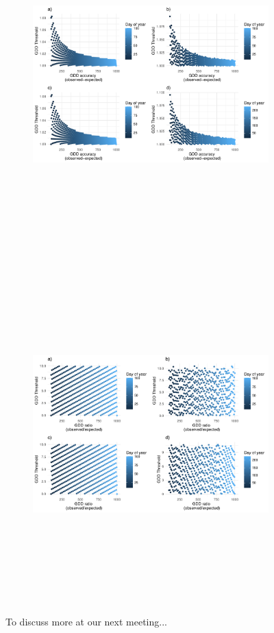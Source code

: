 \documentclass{article}\usepackage[]{graphicx}\usepackage[]{color}
\begin{document}
\begin{figure}
  \begin{subfigure}{\linewidth}
    \caption{}
    \centering
    \includegraphics[height=13cm, width=14cm]{..//analyses/figures/gddratio_basetemp.pdf}
    \label{fig:forecasting}
    \end{subfigure}
  \begin{subfigure}{\linewidth}
	    \caption{}
      \centering
      \includegraphics[height=13cm, width=14cm]{..//analyses/figures/gddaccuracy_basetemp.pdf}
      \label{fig:slopes}
  \end{subfigure}
\caption{To discuss more at our next meeting...}
\label{fig:forecasts}
\end{figure}

  
  
\end{document}
